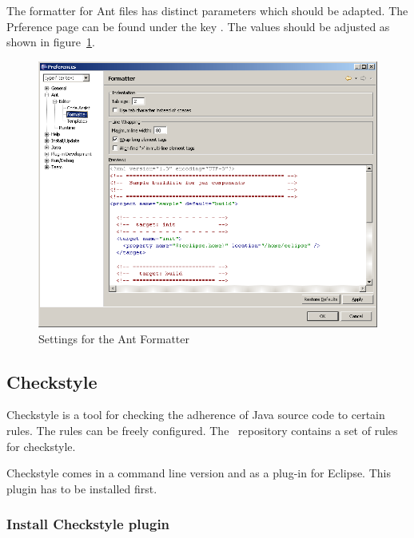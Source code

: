 The formatter for Ant files has distinct parameters which should be
adapted. The Prference page can be found under the key . The values should be adjusted as shown in
figure~\ref{fig:eclipse-ant-formatter}.
\begin{figure}[htp]
  \centering  \includegraphics[scale=.4]{image/eclipse-ant-formatter}
  \caption{Settings for the Ant Formatter}\label{fig:eclipse-ant-formatter}
\end{figure}


\subsection{Checkstyle}

Checkstyle is a tool for checking the adherence of Java source code to
certain rules. The rules can be freely configured. The \ExTeX\
repository contains a set of rules for checkstyle.

Checkstyle comes in a command line version and as a plug-in for
Eclipse. This plugin has to be installed first.

\subsubsection*{Install Checkstyle plugin}

